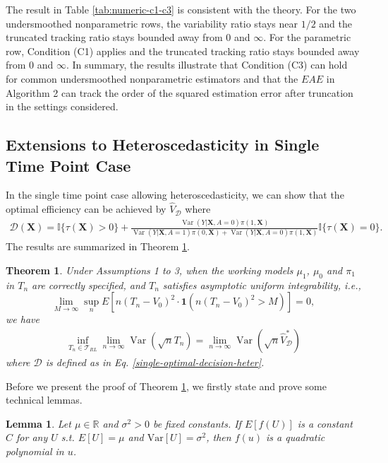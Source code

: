 \documentclass[11pt]{article}
\theoremstyle{referenceplain}
\newtheorem{theorem}{Theorem}
\newtheorem{lemma}{Lemma}[section]
\theoremstyle{referencedefinition}
\theoremstyle{referenceremark}
\begin{document}
The result in Table \ref{tab:numeric-c1-c3} is consistent with the theory. For the two undersmoothed nonparametric rows, the variability ratio stays near $1/2$ and the truncated tracking ratio stays bounded away from $0$ and $\infty$. For the parametric row, Condition (C1) applies and the truncated tracking ratio stays bounded away from $0$ and $\infty$. In summary, the results illustrate that Condition (C3) can hold for common undersmoothed nonparametric estimators and that the $EAE$ in Algorithm 2 can track the order of the squared estimation error after truncation in the settings considered.
\subsection{Extensions to Heteroscedasticity in Single Time Point Case}
In the single time point case allowing heteroscedasticity, we can show that the optimal efficiency can be achieved by $\widehat{V}_{\mathcal{D}}$ where
\begin{align}\label{single-optimal-decision-heter}
    \mathcal{D}(\mathbf{X})=\mathbb{I}\{\tau(\mathbf{X})>0\}+\frac{\operatorname{Var}(Y|\mathbf{X},A=0)\pi(1,\mathbf{X})}{\operatorname{Var}(Y|\mathbf{X},A=1)\pi(0,\mathbf{X})+\operatorname{Var}(Y|\mathbf{X},A=0)\pi(1,\mathbf{X})}\mathbb{I}\{\tau(\mathbf{X})=0\}.
\end{align}
The results are summarized in Theorem \ref{single-eff-opt-heter}.
\begin{theorem}\label{single-eff-opt-heter}
         Under Assumptions 1 to 3, when the working models $\mu_1$, $\mu_0$ and $\pi_1$ in $T_n$ are correctly specified, and $T_n$ satisfies asymptotic uniform integrability, i.e.,
    \[
        \lim _{M \rightarrow \infty} \sup _n E\left[n\left(T_n-V_0\right)^2 \cdot \mathbf{1}\left(n\left(T_n-V_0\right)^2>M\right)\right]=0,
    \]
    we have
    \begin{align*}
        \inf_{T_n\in\mathcal{T}_{RL}}\lim_{n\to\infty}\operatorname{Var}(\sqrt{n}T_n)= \lim_{n\to\infty}\operatorname{Var}(\sqrt{n}\widehat{V}_{\mathcal{D}}^{*})
    \end{align*}
    where $\mathcal{D}$ is defined as in Eq. \eqref{single-optimal-decision-heter}.
\end{theorem}
Before we present the proof of Theorem \ref{single-eff-opt-heter}, we firstly state and prove some technical lemmas.
\begin{lemma}\label{lem: quad est}
Let $\mu \in \mathbb{R}$ and $\sigma^2 > 0$ be fixed constants. If $E[f(U)]$ is a constant $C$ for any $U$ s.t. $E[U] = \mu$ and $\text{Var}[U] = \sigma^2$, then $f(u)$ is a quadratic polynomial in $u$. 
\end{lemma}
\end{document}
